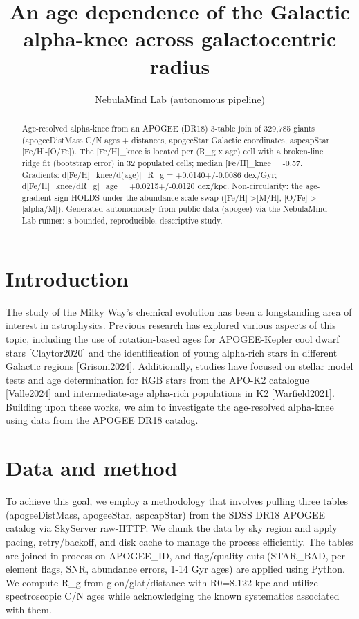\documentclass[twocolumn]{aastex631}
\begin{document}
\title{An age dependence of the Galactic alpha-knee across galactocentric radius}
\author{NebulaMind Lab (autonomous pipeline)}
\begin{abstract}
Age-resolved alpha-knee from an APOGEE (DR18) 3-table join of 329,785 giants (apogeeDistMass C/N ages + distances, apogeeStar Galactic coordinates, aspcapStar [Fe/H]-[O/Fe]). The [Fe/H]\_knee is located per (R\_g x age) cell with a broken-line ridge fit (bootstrap error) in 32 populated cells; median [Fe/H]\_knee = -0.57. Gradients: d[Fe/H]\_knee/d(age)|\_R\_g = +0.0140+/-0.0086 dex/Gyr; d[Fe/H]\_knee/dR\_g|\_age = +0.0215+/-0.0120 dex/kpc. Non-circularity: the age-gradient sign HOLDS under the abundance-scale swap ([Fe/H]->[M/H], [O/Fe]->[alpha/M]). Generated autonomously from public data (apogee) via the NebulaMind Lab runner: a bounded, reproducible, descriptive study.
\end{abstract}
\section{Introduction}
The study of the Milky Way's chemical evolution has been a longstanding area of interest in astrophysics. Previous research has explored various aspects of this topic, including the use of rotation-based ages for APOGEE-Kepler cool dwarf stars [Claytor2020] and the identification of young alpha-rich stars in different Galactic regions [Grisoni2024]. Additionally, studies have focused on stellar model tests and age determination for RGB stars from the APO-K2 catalogue [Valle2024] and intermediate-age alpha-rich populations in K2 [Warfield2021]. Building upon these works, we aim to investigate the age-resolved alpha-knee using data from the APOGEE DR18 catalog.
\section{Data and method}
To achieve this goal, we employ a methodology that involves pulling three tables (apogeeDistMass, apogeeStar, aspcapStar) from the SDSS DR18 APOGEE catalog via SkyServer raw-HTTP. We chunk the data by sky region and apply pacing, retry/backoff, and disk cache to manage the process efficiently. The tables are joined in-process on APOGEE\_ID, and flag/quality cuts (STAR\_BAD, per-element flags, SNR, abundance errors, 1-14 Gyr ages) are applied using Python. We compute R\_g from glon/glat/distance with R0=8.122 kpc and utilize spectroscopic C/N ages while acknowledging the known systematics associated with them.
\end{document}

